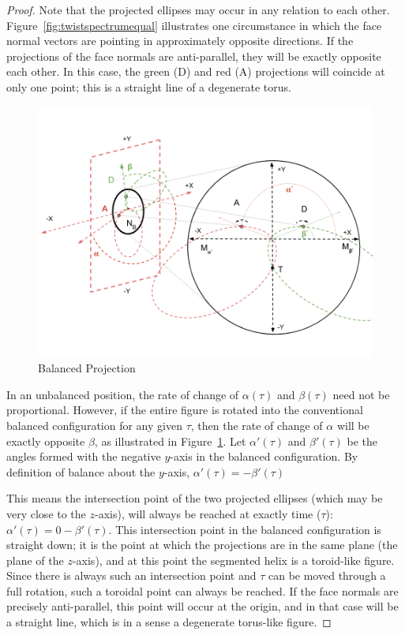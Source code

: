 \documentclass[mathematics,article,submit,pdftex,moreauthors]{Definitions/mdpi}
\begin{document}
\begin{proof}
    Note that the projected ellipses may occur in any relation to each other.
    Figure~\ref{fig:twistspectrumequal} illustrates one circumstance in which the face normal
    vectors are pointing in approximately opposite directions.
    If the
    projections of the
    face normals are anti-parallel, they will be exactly opposite each other. In this
    case, the green (D) and red (A) projections will coincide at only one point; this
    is a straight line of a degenerate torus.
        \begin{figure}
          \centering
  \captionsetup{justification=centering}
     \includegraphics[width=10 cm]{figures/TwistSpectrumProjection.png}
     \caption{Balanced Projection}
  \label{fig:twistspectrumprojection}
    \end{figure}
\unskip


    In an unbalanced position, the rate of change of $\alpha(\tau)$ and $\beta(\tau)$
    need not be proportional.
    However, if the entire figure is rotated into
    the conventional balanced configuration for any given $\tau$, then the rate of
    change of $\alpha$ will be exactly opposite $\beta$,
    as illustrated in Figure~\ref{fig:twistspectrumprojection}. Let $\alpha'(\tau)$ and $\beta'(\tau)$ be the angles
    formed with the negative $y$-axis in the balanced configuration. By definition of balance about the $y$-axis,
    $\alpha'(\tau) = -\beta'(\tau)$

    This means the
    intersection point of the two projected ellipses (which may be very close to the
    $z$-axis), will always be reached at exactly time ($\tau$): $\alpha'(\tau) = 0 - \beta'(\tau)$.
    This intersection point
    in the balanced configuration is straight down; it is the point at which the projections
    are in the same plane (the plane of the $z$-axis), and at this point the segmented
    helix is a toroid-like figure. Since there is always such an intersection point
    and  $\tau$ can be moved through a full rotation, such a toroidal point can always be reached.
    If the face normals are precisely anti-parallel, this point will occur at the origin,
    and in that case will be a straight line, which is in a sense a degenerate torus-like figure.


\end{proof}
\end{document}
